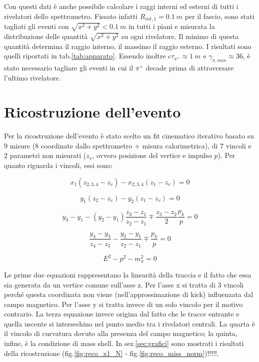 \documentclass[8pt]{extarticle}
\begin{document}
Con questi dati è anche possibile calcolare i raggi interni ed esterni di tutti i rivelatori dello spettrometro. Fissato infatti $R_{int, 1} = 0.1\ m$ per il fascio, sono stati tagliati gli eventi con $\sqrt{x^2+y^2} < 0.1\ m$ in tutti i piani e misurata la distribuzione delle quantità $\sqrt{x^2 + y^2}$ su ogni rivelatore. Il minimo di questa quantità determina il raggio interno, il massimo il raggio esterno. I risultati sono quelli riportati in tab.\ref{tab:apparato}. Essendo inoltre $c\tau_{\pi^+} \approx 1\ m$ e $\gamma_{\pi, min} \approx 36$, è stato necessario tagliare gli eventi in cui il $\pi^+$ decade prima di attraversare l'ultimo rivelatore.

\section{Ricostruzione dell'evento} \label{sec:reconstruction}
Per la ricostruzione dell'evento è stato scelto un fit cinematico iterativo basato su 9 misure (8 coordinate dallo spettrometro + misura calorimetrica), di 7 vincoli e 2 parametri non misurati ($z_v$, ovvero posizione del vertice e impulso $p$). Per quanto riguarda i vincoli, essi sono: 

\begin{equation}
x_1 (z_{2,3,4} - z_v) - x_{2,3,4} (z_1 - z_v) = 0
\end{equation}

\begin{equation}
y_1 (z_{2} - z_v) - y_{2} (z_1 - z_v) = 0
\end{equation}

\begin{equation}
y_3 - y_1 - (y_2-y_1)\frac{z_3-z_1}{z_2-z_1} \mp \frac{z_3-z_2}{2} \frac{p_k}{p} = 0
\label{eq:curvaturay3}
\end{equation}

\begin{equation}
\frac{y_4-y_3}{z_4-z_3} - \frac{y_2-y_1}{z_2-z_1} \mp \frac{p_k}{p} = 0
\end{equation}

\begin{equation}
E^2 - p^2 - m_\pi^2 = 0
\end{equation}

Le prime due equazioni rappresentano la linearità della traccia e il fatto che essa sia generata da un vertice comune sull'asse z. Per l'asse x si tratta di 3 vincoli perché questa coordinata non viene (nell'approssimazione di kick) influenzata dal campo magnetico. Per l'asse y si tratta invece di un solo vincolo per il motivo contrario. La terza equazione invece origina dal fatto che le tracce entrante e quella uscente si intersechino nel punto medio tra i rivelatori centrali. La quarta è il vincolo di curvatura dovuto alla presenza del campo magnetico; la quinta, infine, è la condizione di mass shell. In sez.\ref{sec:grafici} sono mostrati i risultati della ricostruzione (fig.\ref{fig:reco_x1_N} - fig.\ref{fig:reco_miss_norm})!!!!!.
\end{document}

